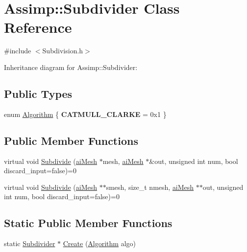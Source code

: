 \hypertarget{class_assimp_1_1_subdivider}{\section{Assimp\+:\+:Subdivider Class Reference}
\label{class_assimp_1_1_subdivider}
}


{\ttfamily \#include $<$Subdivision.\+h$>$}



Inheritance diagram for Assimp\+:\+:Subdivider\+:
\subsection*{Public Types}
\begin{DoxyCompactItemize}
\item 
enum \hyperlink{class_assimp_1_1_subdivider_a5e6b4948d6aaee509e58fb435ad02b9d}{Algorithm} \{ {\bfseries C\+A\+T\+M\+U\+L\+L\+\_\+\+C\+L\+A\+R\+K\+E} = 0x1
 \}
\end{DoxyCompactItemize}
\subsection*{Public Member Functions}
\begin{DoxyCompactItemize}
\item 
virtual void \hyperlink{class_assimp_1_1_subdivider_a4598b3ead068ae7f49bce239e33ee325}{Subdivide} (\hyperlink{structai_mesh}{ai\+Mesh} $\ast$mesh, \hyperlink{structai_mesh}{ai\+Mesh} $\ast$\&out, unsigned int num, bool discard\+\_\+input=false)=0
\item 
virtual void \hyperlink{class_assimp_1_1_subdivider_a26a77d10069201eb198942c8b7459f0f}{Subdivide} (\hyperlink{structai_mesh}{ai\+Mesh} $\ast$$\ast$smesh, size\+\_\+t nmesh, \hyperlink{structai_mesh}{ai\+Mesh} $\ast$$\ast$out, unsigned int num, bool discard\+\_\+input=false)=0
\end{DoxyCompactItemize}
\subsection*{Static Public Member Functions}
\begin{DoxyCompactItemize}
\item 
static \hyperlink{class_assimp_1_1_subdivider}{Subdivider} $\ast$ \hyperlink{class_assimp_1_1_subdivider_a167b67d07cbc0342b02f476f5825cdd4}{Create} (\hyperlink{class_assimp_1_1_subdivider_a5e6b4948d6aaee509e58fb435ad02b9d}{Algorithm} algo)
\end{DoxyCompactItemize}


